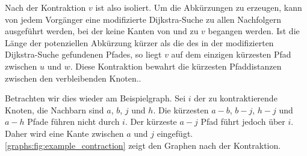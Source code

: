 Nach der Kontraktion $v$ ist also isoliert.
Um die Abkürzungen zu erzeugen, kann von jedem Vorgänger eine modifizierte Dijkstra-Suche zu allen Nachfolgern ausgeführt werden, bei der keine Kanten von und zu $v$ begangen werden.
Ist die Länge der potenziellen Abkürzung kürzer als die des in der modifizierten Dijkstra-Suche gefundenen Pfades, so liegt $v$ auf dem einzigen kürzesten Pfad zwischen $u$ und $w$.
Diese Kontraktion bewahrt die kürzesten Pfaddistanzen zwischen den verbleibenden Knoten..

Betrachten wir dies wieder am Beispielgraph.
Sei $i$ der zu kontraktierende Knoten, die Nachbarn sind $a$, $b$, $j$ und $h$.
Die kürzesten $a-b$, $b-j$, $h-j$ und $a-h$ Pfade führen nicht durch $i$.
Der kürzeste $a-j$ Pfad führt jedoch über $i$.
Daher wird eine Kante zwischen $a$ und $j$ eingefügt.
\autoref{graphs:fig:example_contraction} zeigt den Graphen nach der Kontraktion.

